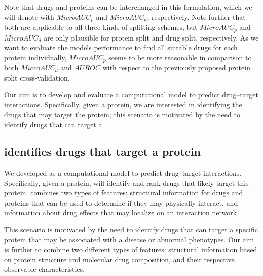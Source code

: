 \documentclass{bioinfo}
\begin{document}
Note that drugs and proteins can be interchanged in this formulation, which we will denote with $MicroAUC_p$ and $MicroAUC_d$, respectively. Note further that both are applicable to all three kinds of splitting schemes, but $MicroAUC_p$ and $MicroAUC_d$ are only plausible for protein split and drug split, respectively. As we want to evaluate the models performance to find all suitable drugs for each protein individually, \textit{$MicroAUC_p$} seems to be more reasonable in comparison to both $MicroAUC_d$ and $AUROC$ with respect to the previously proposed protein split cross-validation. 




Our aim is to develop and evaluate a computational model to predict
drug--target interactions. Specifically, given a protein, we are
interested in identifying the drugs that may target the protein; this
scenario is motivated by the need to identify drugs that can target a

\subsection{\name identifies drugs that target a protein}

We developed \name as a computational model to predict drug--target
interactions. Specifically, given a protein, \name will identify and
rank drugs that likely target this protein. \name combines two 
types of features: structural information for drugs and proteins that
can be used to determine if they may physically interact, and
information about drug effects that may localize on an interaction
network.

This scenario is motivated by the need to identify drugs that can target a
specific protein that may be associated with a disease or abnormal
phenotypes.
Our aim is further to combine two different types of features:
structural information based on protein structure and molecular drug composition, and their respective observable characteristics.
\end{document}
